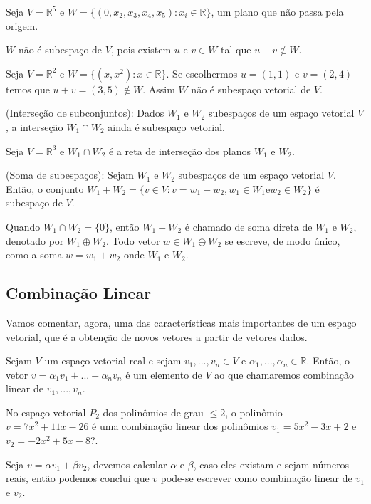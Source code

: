 \begin{ex}
	Seja $V= \mathbb{R}^{5}$ e $W=\{(0,x_{2},x_{3},x_{4},x_{5}): x_{i}\in \mathbb{R}\}$, um plano que não passa pela origem.
\end{ex}
$W$ não é subespaço de $V$, pois existem $u$ e $v\in W$ tal que $u+v\notin W$.
\begin{ex}
	Seja $V= \mathbb{R}^{2}$ e $W=\{(x,x^{2}): x\in \mathbb{R}\}$. Se escolhermos $u=(1,1)$ e $v=(2,4)$ temos que $u+v=(3,5) \notin W$. Assim $W$ não é subespaço vetorial de $V$.
\end{ex}
\begin{teo}
	(Interseção de subconjuntos): Dados $W_{1}$ e $W_{2}$ subespaços de um espaço vetorial $V$, a interseção $W_{1}\cap W_{2}$ ainda é subespaço vetorial.
\end{teo}
\begin{ex}
	Seja $V= \mathbb{R}^{3}$ e $W_{1}\cap W_{2}$ é a reta de interseção dos planos $W_{1}$ e $W_{2}$.
\end{ex}
\begin{teo}
	(Soma de subespaços): Sejam $W_{1}$ e $W_{2}$ subespaços de um espaço vetorial $V$. Então, o conjunto $W_{1}+W_{2}=\{v\in V: v=w_{1}+w_{2}, w_{1}\in W_{1} \text{e} w_{2}\in W_{2}\}$ é subespaço de $V$.
\end{teo}
Quando $W_{1}\cap W_{2}=\{0\}$, então $W_{1}+W_{2}$ é chamado de soma direta de $W_{1}$ e $W_{2}$, denotado por $W_{1}\oplus W_{2}$. Todo vetor $w\in W_{1}\oplus W_{2}$ se escreve, de modo único, como a soma $w=w_{1}+w_{2}$ onde $W_{1}$ e $W_{2}$.

\subsection{Combinação Linear} 

Vamos comentar, agora, uma das características mais importantes de um espaço vetorial, que é a obtenção de novos vetores a partir de vetores dados.
\begin{df}
Sejam $V$ um espaço vetorial real e sejam $v_{1},...,v_{n}\in V$ e $\alpha_{1},...,\alpha_{n}\in \mathbb{R}$. Então, o vetor $v=\alpha_{1}v_{1}+...+\alpha_{n}v_{n}$ é um elemento de $V$ ao que chamaremos combinação linear de $v_{1},...,v_{n}$.
\end{df}
\begin{ex}
	No espaço vetorial $P_{2}$ dos polinômios de grau $\leqslant 2$, o polinômio $v=7x^{2}+11x-26$ é uma combinação linear dos polinômios $v_{1}=5x^{2}-3x+2$ e $v_{2}=-2x^{2}+5x-8$?.
\end{ex}
Seja $v=\alpha v_{1}+\beta v_{2}$, devemos calcular $\alpha$ e $\beta$, caso eles existam e sejam números reais, então podemos conclui que $v$ pode-se escrever como combinação linear de $v_{1}$ e $v_{2}$.

